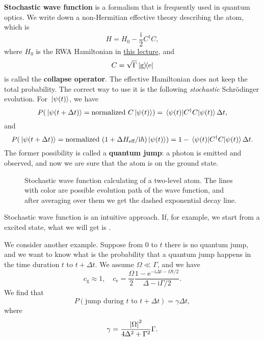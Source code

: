 \documentclass[hyperref, a4paper]{article}
\newcommand*{\ii}{\mathrm{i}}
\newcommand*{\ee}{\mathrm{e}}
\newcommand*{\concept}[1]{{\textbf{#1}}}
\begin{document}
\concept{Stochastic wave function} is a formalism that is frequently used in quantum optics.
We write down a non-Hermitian effective theory describing the atom, which is 
\begin{equation}
    H = H_0 - \frac{\ii}{2} C^\dagger C,
\end{equation}
where $H_0$ is the RWA Hamiltonian in \href{10-28.pdf}{this lecture}, and
\begin{equation}
    C = \sqrt{\Gamma} \dyad{\text{g}}{\text{e}}
\end{equation}
is called the \concept{collapse operator}.
The effective Hamiltonian does not keep the total probability. The correct way to use it is the following 
\emph{stochastic} Schrödinger evolution. For $\ket*{\psi(t)}$, we have 
\begin{equation}
    P(\ket*{\psi(t + \Delta t)} = \text{normalized $C \ket*{\psi(t)}$}) = \expval*{C^\dagger C}{\psi(t)} \Delta t,
\end{equation}
and 
\begin{equation}
    P(\ket*{\psi(t + \Delta t)} = \text{normalized $(1 + \Delta H_\text{eff} / \ii \hbar) \ket*{\psi(t)}$}) 
    = 1 - \expval*{C^\dagger C}{\psi(t)} \Delta t.
\end{equation}
The former possibility is called a \concept{quantum jump}: a photon is emitted and observed, and now we are 
sure that the atom is on the ground state.

\begin{figure}
    \centering
    
    \caption{Stochastic wave function calculating of a two-level atom. The lines with color are possible 
    evolution path of the wave function, and after averaging over them we get the dashed exponential decay
    line.}
    \label{fig:excited-decay}
\end{figure}

Stochastic wave function is an intuitive approach. If, for example, we start from a excited state, 
what we will get is . 

We consider another example. Suppose from $0$ to $t$ there is no quantum jump, and we want to know 
what is the probability that a quantum jump happens in the time duration $t$ to $t + \Delta t$.
We assume $\Omega \ll \Gamma$, and we have 
\begin{equation}
    c_\text{g} \approx 1, \quad c_\text{e} = \frac{\Omega}{2} 
    \frac{1 - \ee^{- \ii \Delta t - \Omega t / 2}}{\Delta - \ii \Gamma / 2}.
\end{equation}
We find that 
\begin{equation}
    P(\text{jump during $t$ to $t + \Delta t$}) = \gamma \Delta t,
\end{equation}
where 
\begin{equation}
    \gamma = \frac{\abs{\Omega}^2}{4 \Delta^2 + \Gamma^2 } \Gamma.
\end{equation}
\end{document}
